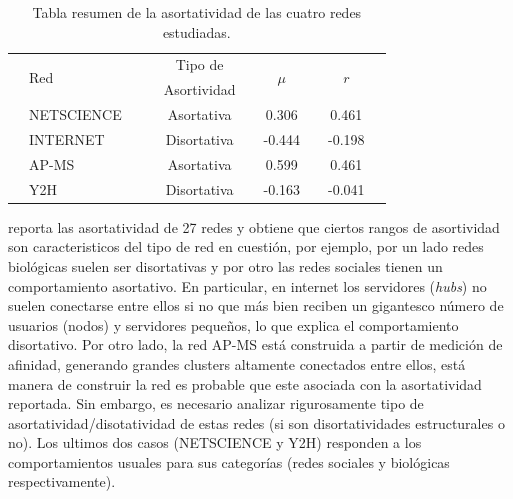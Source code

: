 \begin{table}[!ht]
    \centering
    \caption{\label{tab:assort} Tabla resumen de la asortatividad de las cuatro redes estudiadas.}
    {\scriptsize
    \begin{tabularx}{1\columnwidth}{XlX|XcXcXcX}
        \hline\hline
        & \multirow{2}{*}{Red}  &&& Tipo de     && \multirow{2}{*}{$\mu$}   && \multirow{2}{*}{$r$} &\\ 
        &                       &&& Asortividad &&                          &&                      &\\ 
        \hline
        & NETSCIENCE           &&& Asortativa   &&   0.306                  &&  0.461                &\\
        & INTERNET             &&& Disortativa  &&  -0.444                  && -0.198                &\\
        & AP-MS                &&& Asortativa   &&   0.599                  &&  0.461                &\\
        & Y2H                  &&& Disortativa  &&  -0.163                  && -0.041                &\\
        \hline\hline
    \end{tabularx}
    }
\end{table}

\citet{newman2003} reporta las asortatividad de 27 redes y obtiene que ciertos rangos de asortividad son caracteristicos del 
tipo de red en cuesti\'on, por ejemplo, por un lado redes biol\'ogicas suelen ser disortativas y por otro las redes sociales
tienen un comportamiento asortativo. En particular, en internet los  servidores (\textit{hubs}) no suelen conectarse 
entre ellos si no que m\'as bien reciben un gigantesco n\'umero de usuarios (nodos) y servidores peque\~nos, lo que explica
el comportamiento disortativo. Por otro lado, la red AP-MS est\'a construida a partir de medici\'on de afinidad, generando
grandes clusters altamente conectados entre ellos, est\'a manera de construir la red es probable que este asociada con la 
asortatividad reportada. Sin embargo, es necesario analizar rigurosamente tipo de asortatividad/disotatividad de estas redes
(si son disortatividades estructurales o no). Los ultimos dos casos (NETSCIENCE y Y2H) responden a los comportamientos
usuales para sus categor\'ias (redes sociales y biol\'ogicas respectivamente).

